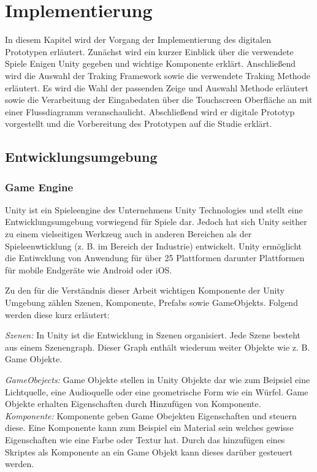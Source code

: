 \chapter{Implementierung}\label{implementation}

In diesem Kapitel wird der Vorgang der Implementierung des digitalen Prototypen erläutert. Zunächst wird ein kurzer Einblick über die verwendete Spiele Enigen Unity gegeben und wichtige Komponente erklärt. 
Anschließend wird die Auswahl der Traking Framework sowie die verwendete Traking Methode erläutert. Es wird die Wahl der passenden Zeige und Auswahl Methode erläutert sowie die Verarbeitung der 
Eingabedaten über die Touchscreen Oberfläche an mit einer Flussdiagramm veranschaulicht. Abschließend wird er digitale Prototyp vorgestellt und die Vorbereitung des Prototypen auf die Studie erklärt. 

\section{Entwicklungsumgebung}

\subsection{Game Engine}

Unity ist ein Spieleengine des Unternehmens Unity Technologies und stellt eine Entwicklungsumgebung vorwiegend für Spiele dar. Jedoch hat sich Unity seither 
zu einem vielseitigen Werkzeug auch in anderen Bereichen als der Spieleenwticklung (z. B. im Bereich der Industrie) entwickelt. 
Unity ermöglicht die Entiwcklung von Anwendung für über 25 Plattformen darunter Plattformen für mobile Endgeräte wie Android oder iOS.

Zu den für die Verständnis dieser Arbeit wichtigen Komponente der Unity Umgebung zählen Szenen, Komponente, Prefabs sowie GameObjekts. Folgend werden diese kurz erläutert:

\textit{Szenen:} In Unity ist die Entwicklung in Szenen organisiert. Jede Szene besteht aus einem Szenengraph. Dieser Graph enthält wiederum weiter Objekte wie z. B. Game Objekte. 

\textit{GameObejects:} Game Objekte stellen in Unity Objekte dar wie zum Beipsiel eine Lichtquelle, eine Audioquelle oder eine geometrische Form wie ein Würfel. Game Objekte erhalten Eigenschaften durch 
Hinzufügen von Komponente. \cite{Unity}\\

\textit{Komponente:} Komponente geben Game Obejekten Eigenschaften und steuern diese. Eine Komponente kann zum Beispiel ein Material sein welches gewisse Eigenschaften wie eine Farbe oder Textur hat. 
Durch das hinzufügen eines Skriptes als Komponente an ein Game Objekt kann dieses darüber gesteuert werden.\cite{Unity}\\

